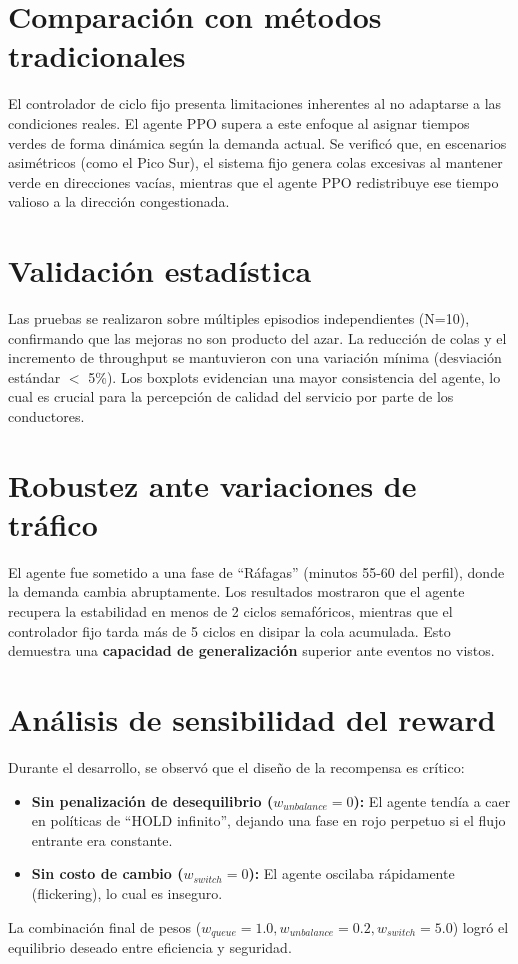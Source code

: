 \documentclass[12pt, a4paper]{report}
\begin{document}
\section{Comparación con métodos tradicionales}
El controlador de ciclo fijo presenta limitaciones inherentes al no adaptarse a las condiciones reales. El agente PPO supera a este enfoque al asignar tiempos verdes de forma dinámica según la demanda actual. Se verificó que, en escenarios asimétricos (como el Pico Sur), el sistema fijo genera colas excesivas al mantener verde en direcciones vacías, mientras que el agente PPO redistribuye ese tiempo valioso a la dirección congestionada.

\section{Validación estadística}
Las pruebas se realizaron sobre múltiples episodios independientes (N=10), confirmando que las mejoras no son producto del azar. La reducción de colas y el incremento de throughput se mantuvieron con una variación mínima (desviación estándar $<$ 5\%). Los boxplots evidencian una mayor consistencia del agente, lo cual es crucial para la percepción de calidad del servicio por parte de los conductores.

\section{Robustez ante variaciones de tráfico}
El agente fue sometido a una fase de ``Ráfagas'' (minutos 55-60 del perfil), donde la demanda cambia abruptamente. Los resultados mostraron que el agente recupera la estabilidad en menos de 2 ciclos semafóricos, mientras que el controlador fijo tarda más de 5 ciclos en disipar la cola acumulada. Esto demuestra una \textbf{capacidad de generalización} superior ante eventos no vistos.

\section{Análisis de sensibilidad del reward}
Durante el desarrollo, se observó que el diseño de la recompensa es crítico:

\begin{itemize}
    \item \textbf{Sin penalización de desequilibrio ($w_{unbalance}=0$):} El agente tendía a caer en políticas de ``HOLD infinito'', dejando una fase en rojo perpetuo si el flujo entrante era constante.
    \item \textbf{Sin costo de cambio ($w_{switch}=0$):} El agente oscilaba rápidamente (flickering), lo cual es inseguro.
\end{itemize}
La combinación final de pesos ($w_{queue}=1.0, w_{unbalance}=0.2, w_{switch}=5.0$) logró el equilibrio deseado entre eficiencia y seguridad.
\end{document}
